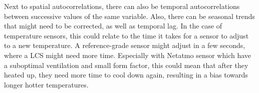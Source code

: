 Next to spatial autocorrelations, there can also be temporal autocorrelations between successive values of the same variable. Also, there can be seasonal trends that might need to be corrected, as well as temporal lag. In the case of temperature sensors, this could relate to the time it takes for a sensor to adjust to a new temperature. A reference-grade sensor might adjust in a few seconds, where a LCS might need more time. Especially with Netatmo sensor which have a suboptimal ventilation and small form factor, this could mean that after they heated up, they need more time to cool down again, resulting in a bias towards longer hotter temperatures.
